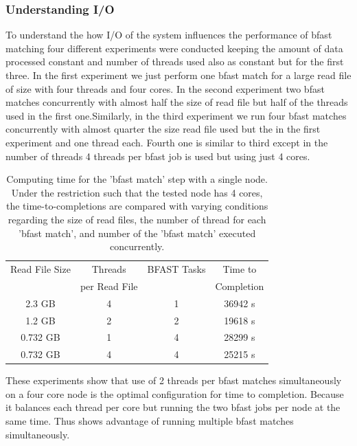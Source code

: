 \documentclass{acm_proc_article-sp}
\begin{document}
\subsubsection{Understanding I/O}
{
To understand the how I/O of the system influences the performance of bfast matching four different experiments were conducted keeping the amount of data processed constant and number of threads used also as constant but for the first three. In the first experiment we just perform one bfast match for a large read file of size with four threads and four cores. In the second experiment two bfast matches concurrently with almost half the size of read file but half of the threads used in the first one.Similarly, in the third experiment we run four bfast matches concurrently with almost quarter the size read file used but the in the first experiment and one thread each. Fourth one is similar to third except in the number of threads 4 threads per bfast job is used but using just 4 cores.

 \begin{table}
 \begin{tabular}{|c|c|c|c|} 
 \hline 
Read File Size & Threads  & BFAST Tasks & Time to \\
& per Read File&  &  Completion \\  \hline
2.3 GB &  4 & 1 & 36942 s \\
1.2 GB & 2 & 2 & 19618 s \\
0.732 GB & 1 & 4 & 28299 s\\ 
0.732  GB & 4 & 4 & 25215 s\\

 \hline
 \end{tabular}
 \label{table:understand I/o} 
 \caption{Computing time for the 'bfast match' step with a single node.  Under the restriction such that the tested node has 4 cores, the time-to-completions are compared with varying conditions regarding the size of read files, the number of thread for each 'bfast match', and number of the 'bfast match' executed concurrently.}
\end{table}

These experiments show that use of 2 threads per bfast matches simultaneously on a four core node is the optimal configuration for time to completion. Because it balances each thread per core but  running the two bfast jobs per node at the same time. Thus shows advantage of running multiple bfast matches simultaneously. 


}

\end{document}
